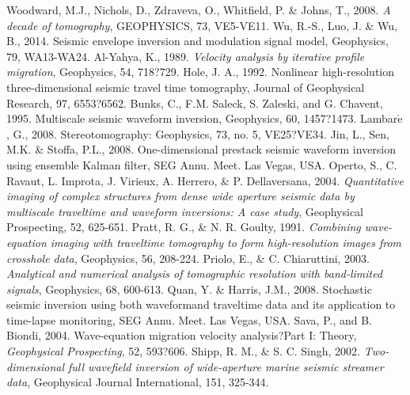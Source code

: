 \documentclass[mreferee]{gji}
\begin{document}
\begin{thebibliography}{}
 Woodward, M.J., Nichols, D., Zdraveva, O., Whitfield, P. \& Johns, T., 2008. \textit{A decade of tomography}, GEOPHYSICS, 73, VE5-VE11.
 Wu, R.-S., Luo, J. \& Wu, B., 2014. Seismic envelope inversion and modulation signal model, Geophysics, 79, WA13-WA24.
 Al-Yahya, K., 1989. \textit{Velocity analysis by iterative profile migration}, Geophysics, 54, 718?729.
 Hole, J. A., 1992. Nonlinear high-resolution three-dimensional seismic travel time tomography, Journal of Geophysical Research, 97, 6553?6562.
 Bunks, C., F.M. Saleck, S. Zaleski, and G. Chavent, 1995. Multiscale seismic waveform inversion,  Geophysics, 60, 1457?1473.
 Lambar$\acute{\textrm{e}}$, G., 2008. Stereotomography: Geophysics, 73, no. 5, VE25?VE34.
 Jin, L., Sen, M.K. \& Stoffa, P.L., 2008. One-dimensional prestack seismic waveform inversion using ensemble Kalman filter, SEG Annu. Meet. Las Vegas, USA.
 Operto, S., C. Ravaut, L. Improta, J. Virieux, A. Herrero, \& P. Dellaversana, 2004. \textit{Quantitative imaging of complex structures from dense wide aperture seismic data by multiscale traveltime and waveform inversions: A case study}, Geophysical Prospecting, 52, 625-651.
 Pratt, R. G., \& N. R. Goulty, 1991. \textit{Combining wave-equation imaging with traveltime tomography to form high-resolution images from crosshole data}, Geophysics, 56, 208-224.
 Priolo, E., \& C. Chiaruttini, 2003. \textit{Analytical and numerical analysis of tomographic resolution with band-limited signals}, Geophysics, 68, 600-613.
 Quan, Y. \& Harris, J.M., 2008. Stochastic seismic inversion using both waveformand traveltime data and its application to time-lapse monitoring, SEG Annu. Meet. Las Vegas, USA.
 Sava, P., and B. Biondi, 2004. Wave-equation migration velocity analysis?Part I: Theory, \textit{Geophysical Prospecting}, 52, 593?606.
 Shipp, R. M., \& S. C. Singh, 2002. \textit{Two-dimensional full wavefield inversion of wide-aperture marine seismic streamer data}, Geophysical Journal International, 151, 325-344.

\end{thebibliography}
\end{document}
